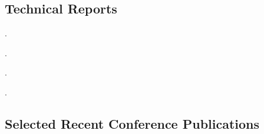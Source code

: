 \documentclass[10pt]{article}
\begin{document}
\subsection*{Technical Reports}
\begin{enumerate}[label={[\arabic*]}]
\setlength{\itemsep}{-1mm}
\leftskip-0.13in %
   \item{}.
   \item{}.
   \item{}.
   \item{}.   
\end{enumerate}

\subsection*{Selected Recent Conference Publications}
\end{document}
